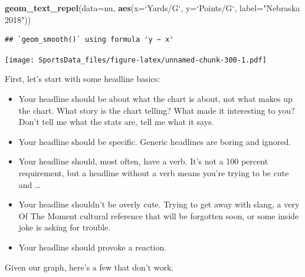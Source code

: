 \documentclass[
]{book}
\newenvironment{Shaded}{\begin{snugshade}}{\end{snugshade}}
\newcommand{\DataTypeTok}[1]{\textcolor[rgb]{0.13,0.29,0.53}{#1}}
\newcommand{\KeywordTok}[1]{\textcolor[rgb]{0.13,0.29,0.53}{\textbf{#1}}}
\newcommand{\NormalTok}[1]{#1}
\newcommand{\StringTok}[1]{\textcolor[rgb]{0.31,0.60,0.02}{#1}}
\providecommand{\tightlist}{%
  \setlength{\itemsep}{0pt}\setlength{\parskip}{0pt}}
\begin{document}
\begin{Shaded}
\begin{Highlighting}[]
\StringTok{  }\KeywordTok{geom_text_repel}\NormalTok{(}\DataTypeTok{data=}\NormalTok{nu, }\KeywordTok{aes}\NormalTok{(}\DataTypeTok{x=}\StringTok{`}\DataTypeTok{Yards/G}\StringTok{`}\NormalTok{, }\DataTypeTok{y=}\StringTok{`}\DataTypeTok{Points/G}\StringTok{`}\NormalTok{, }\DataTypeTok{label=}\StringTok{"Nebraska 2018"}\NormalTok{))}
\end{Highlighting}
\end{Shaded}

\begin{verbatim}
## `geom_smooth()` using formula 'y ~ x'
\end{verbatim}

\texttt{[image: SportsData\_files/figure-latex/unnamed-chunk-300-1.pdf]}

First, let's start with some headline basics:

\begin{itemize}
\tightlist
\item
  Your headline should be about what the chart is about, not what makes up the chart. What story is the chart telling? What made it interesting to you? Don't tell me what the stats are, tell me what it says.
\item
  Your headline should be specific. Generic headlines are boring and ignored.
\item
  Your headline should, most often, have a verb. It's not a 100 percent requirement, but a headline without a verb means you're trying to be cute and \ldots{}
\item
  Your headline shouldn't be overly cute. Trying to get away with slang, a very Of The Moment cultural reference that will be forgotten soon, or some inside joke is asking for trouble.
\item
  Your headline should provoke a reaction.
\end{itemize}

Given our graph, here's a few that don't work.
\end{document}
